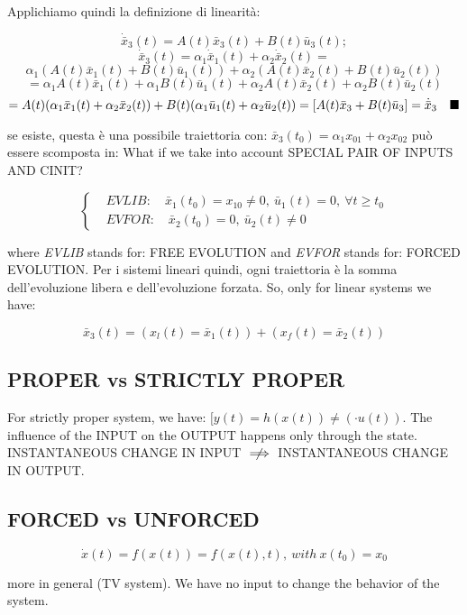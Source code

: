 Applichiamo quindi la definizione di linearità:

\[
	\dot{\bar{x}}_3(t) = A(t)\bar{x}_3(t) + B(t)\bar{u}_3(t);
\]
\[
	\dot{\bar{x}}_3(t) = \alpha_1\dot{\bar{x}}_1(t) + \alpha_2\dot{\bar{x}}_2(t) =
\]
\[
	\alpha_1(A(t)\bar{x}_1(t) + B(t)\bar{u}_1(t)) + \alpha_2(A(t)\bar{x}_2(t) + B(t)\bar{u}_2(t))
\]
\[
	= \alpha_1A(t)\bar{x}_1(t) + \alpha_1B(t)\bar{u}_1(t) + \alpha_2A(t)\bar{x}_2(t) + \alpha_2B(t)\bar{u}_2(t)
\]
\[
	= A(t)(\alpha_1\bar{x}_1(t) + \alpha_2\bar{x}_2(t)) + B(t)(\alpha_1\bar{u}_1(t) + \alpha_2\bar{u}_2(t)) = [A(t)\bar{x}_3 + B(t)\bar{u}_3] = \dot{\bar{x}}_3 \quad \QEDA
\]

se esiste, questa è una possibile traiettoria con: $\bar{x}_3(t_0) = \alpha_1 x_{01} + \alpha_2 x_{02}$ può essere scomposta in: What if we take into account SPECIAL PAIR OF INPUTS AND CINIT?

\[
 	\left\{
	\begin{aligned}
	&EVLIB:\quad \bar{x}_1(t_0) = x_{10} \neq 0,\ \bar{u}_1(t) = 0,\ \forall t \geq t_0 \\
	&EVFOR:\quad \bar{x}_2(t_0) = 0,\ \bar{u}_2(t) \neq 0
	\end{aligned} 
	\right.
\]

where \emph{EVLIB} stands for: FREE EVOLUTION and \emph{EVFOR} stands for: FORCED EVOLUTION. 
Per i sistemi lineari quindi, ogni traiettoria è la somma dell'evoluzione libera e dell'evoluzione forzata.
So, only for linear systems we have:

\[
	\bar{x}_3(t) = (x_l(t) = \bar{x}_1(t)) + (x_f(t) = \bar{x}_2(t))
\]

\subsection{PROPER vs STRICTLY PROPER}

For strictly proper system, we have: $[y(t) = h(x(t)) \neq (\mathord{\cdot}u(t))$. The influence of the INPUT on the OUTPUT happens only through the state. INSTANTANEOUS CHANGE IN INPUT $\centernot\implies$ INSTANTANEOUS CHANGE IN OUTPUT.

\subsection{FORCED vs UNFORCED}

\[	
	\dot{x}(t) = f(x(t)) = f(x(t),t),\ with\ x(t_0) = x_0
\]

more in general (TV system). We have no input to change the behavior of the system. 


